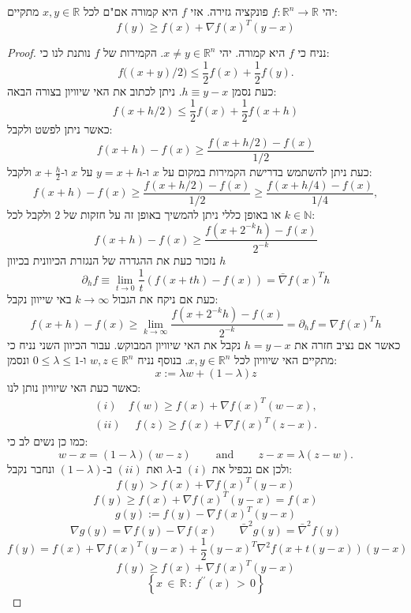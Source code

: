 \documentclass{tstextbook}
\begin{document}
\begin{proposition}
יהי \(f:\mathbb{R}^{n}\to \mathbb{R}\) פונקציה גזירה. אזי \(f\) היא קמורה אם"ם לכל \(x,y \in \mathbb{R}\) מתקיים:
$$f(y)\geq f(x)+\nabla f(x)^{T}(y-x)$$

\end{proposition}
\begin{proof}
נניח כי \(f\) היא קמורה. יהי \(x\neq y \in \mathbb{R}^{n}\). הקמירות של \(f\) נותנת לנו כי:
$$f{\big(}(x+y)/2{\big)}\leq{\frac{1}{2}}f(x)+{\frac{1}{2}}f(y).$$
כעת נסמן \(h\equiv y-x\). ניתן לכתוב את האי שיוויון בצורה הבאה:
$$f(x+h/2)\leq{\frac{1}{2}}f(x)+{\frac{1}{2}}f(x+h)$$
כאשר ניתן לפשט ולקבל:
$$f(x+h)-f(x)\geq{\frac{f(x+h/2)-f(x)}{1/2}}$$
כעת ניתן להשתמש בדרישת הקמירות במקום על \(x\) ו-\(y=x+h\) על \(x\) ו-\(x+\frac{h}{2}\) ולקבל:
$$f(x+h)-f(x)\geq{\frac{f(x+h/2)-f(x)}{1/2}}\geq{\frac{f(x+h/4)-f(x)}{1/4}},$$
או באופן כללי ניתן להמשיך באופן זה על חזקות של 2 ולקבל לכל \(k \in \mathbb{N}\):
$$f(x+h)-f(x)\geq{\frac{f(x+2^{-k}h)-f(x)}{2^{-k}}}$$
נזכור כעת את ההגדרה של הנגזרת הכיוונית בכיוון \(h\)$$\partial_{h} f\equiv \lim_{ t \to 0 } \frac{1}{t}(f(x+th)-f(x)) = \bar{\nabla} f(x)^{T}h$$
כעת אם ניקח את הגבול \(k\to \infty\) באי שייוון נקבל:
$$f(x+h)-f(x)\geq\operatorname*{lim}_{k\to\infty}{\frac{f(x+2^{-k}h)-f(x)}{2^{-k}}}=\partial_{h}f=\nabla f(x)^{T}h$$
כאשר אם נציב חזרה את \(h=y-x\) נקבל את האי שיוויון המבוקש. 
עבור הכיוון השני נניח כי מתקיים האי שיוויון לכל \(x, y \in \mathbb{R}^{n}\). בנוסף נניח \(w,z \in \mathbb{R}^{n}\) ו-\(0\leq \lambda \leq 1\) ונסמן:
$$x:= \lambda w+\left( 1-\lambda \right) z$$
כאשר כעת האי שיוויון נותן לנו:
$$\begin{array}{c}{(i)\quad {f(w)\geq f(x)+\nabla f(x)^{T}(w-x),}}\\ (ii)\quad \;{{f(z)\geq f(x)+\nabla f(x)^{T}(z-x).}}\end{array}$$
כמו כן נשים לב כי:
$$w-x=(1-\lambda)(w-z)\qquad{\mathrm{~and~}}\qquad z-x=\lambda(z-w).$$
ולכן אם נכפיל את \((i)\) ב-\(\lambda\) ואת \((ii)\) ב-\(\left( 1-\lambda \right)\) ונחבר נקבל:
$$f(y)>f(x)+\nabla f(x)^{T}(y-x)$$$$f(y)\geq f(x)+\nabla f(x)^{T}(y-x)=f(x)$$$$g(y):=f(y)-\nabla f(x)^{T}(y-x)$$$$\nabla g(y)=\nabla f(y)-\nabla f(x) \qquad \bar{\nabla}^2 g(y)=\bar{\nabla}^2 f(y)$$$$f(y)=f(x)+\nabla f(x)^{T}(y-x)+{\frac{1}{2}}(y-x)^{T}\nabla^{2}f(x+t(y-x))(y-x)$$$$f(y)\geq f(x)+\nabla f(x)^{T}(y-x)$$$$\left\{x\,\in\,\mathbb{R}\,:\,f^{\prime\prime}(x)\,>\,0\right\}$$

\end{proof}
\end{document}
